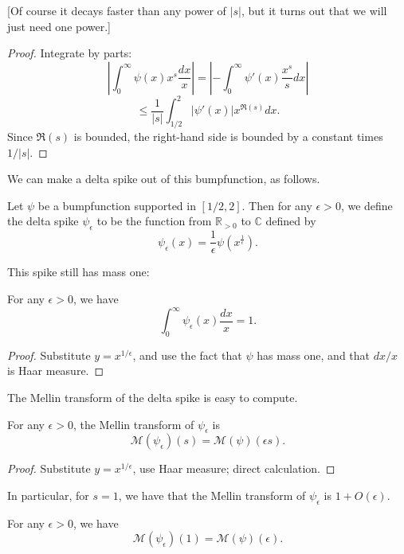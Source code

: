 [Of course it decays faster than any power of $|s|$, but it turns out that we will just need one
power.]


\begin{proof}
Integrate by parts:
$$
\left|\int_0^\infty \psi(x)x^s\frac{dx}{x}\right| =
\left|-\int_0^\infty \psi'(x)\frac{x^{s}}sdx\right|
$$
$$
\le \frac{1}{|s|} \int_{1/2}^2|\psi'(x)|x^{\Re(s)}dx.
$$
Since $\Re(s)$ is bounded, the right-hand side is bounded by a
constant times $1/|s|$.
\end{proof}


We can make a delta spike out of this bumpfunction, as follows.
\begin{definition}[DeltaSpike]\label{DeltaSpike}\leanok
{}
Let $\psi$ be a bumpfunction supported in $[1/2,2]$. Then for any $\epsilon>0$, we define the
delta spike $\psi_\epsilon$ to be the function from $\mathbb{R}_{>0}$ to $\mathbb{C}$ defined by
$$\psi_\epsilon(x) = \frac{1}{\epsilon}\psi\left(x^{\frac{1}{\epsilon}}\right).$$
\end{definition}


This spike still has mass one:
\begin{lemma}[DeltaSpikeMass]\label{DeltaSpikeMass}\leanok
For any $\epsilon>0$, we have
$$\int_0^\infty \psi_\epsilon(x)\frac{dx}{x} = 1.$$
\end{lemma}


\begin{proof}\leanok
{}
Substitute $y=x^{1/\epsilon}$, and use the fact that $\psi$ has mass one, and that $dx/x$ is Haar
measure.
\end{proof}


The Mellin transform of the delta spike is easy to compute.
\begin{theorem}[MellinOfDeltaSpike]\label{MellinOfDeltaSpike}\leanok
For any $\epsilon>0$, the Mellin transform of $\psi_\epsilon$ is
$$\mathcal{M}(\psi_\epsilon)(s) = \mathcal{M}(\psi)\left(\epsilon s\right).$$
\end{theorem}


\begin{proof}\leanok
{}
Substitute $y=x^{1/\epsilon}$, use Haar measure; direct calculation.
\end{proof}


In particular, for $s=1$, we have that the Mellin transform of $\psi_\epsilon$ is $1+O(\epsilon)$.
\begin{corollary}[MellinOfDeltaSpikeAt1]\label{MellinOfDeltaSpikeAt1}
\leanok
For any $\epsilon>0$, we have
$$\mathcal{M}(\psi_\epsilon)(1) =
\mathcal{M}(\psi)(\epsilon).$$
\end{corollary}



